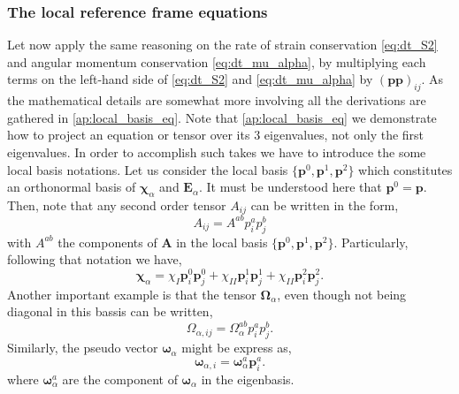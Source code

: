 \subsubsection{The local reference frame equations}

Let now apply the same reasoning on the rate of strain conservation \eqref{eq:dt_S2} and angular momentum conservation \eqref{eq:dt_mu_alpha},
by multiplying each terms on the left-hand side of \ref{eq:dt_S2} and \ref{eq:dt_mu_alpha} by $(\textbf{pp})_{ij}$. 
As the mathematical details are somewhat more involving all the derivations are gathered in \ref{ap:local_basis_eq}. 
Note that \ref{ap:local_basis_eq} we demonstrate how to project an equation or tensor over its $3$ eigenvalues, not only the first eigenvalues. 
In order to accomplish such takes we have to introduce the some local basis notations. 
Let us consider the local basis $\{\textbf{p}^0, \textbf{p}^1, \textbf{p}^2\}$ which constitutes an orthonormal basis of $\bm\chi_\alpha$ and $\textbf{E}_\alpha$. 
It must be understood here that $\textbf{p}^0 = \textbf{p}$. 
Then, note that any second order tensor $A_{ij}$ can be written in the form, 
\begin{equation*}
    A_{ij}
    = 
    A^{ab} p_i^ap_j^b
\end{equation*}
with $A^{ab}$ the components of \textbf{A} in the local basis  $\{\textbf{p}^0, \textbf{p}^1, \textbf{p}^2\}$. 
Particularly, following that notation we have,  
\begin{equation*}
    \bm\chi_\alpha
    = 
    \chi_I  \textbf{p}_i^0\textbf{p}_j^0
    + \chi_{II}  \textbf{p}_i^1\textbf{p}_j^1
    + \chi_{II}  \textbf{p}_i^2\textbf{p}_j^2. 
\end{equation*}
Another important example is that the tensor $\bm\Omega_\alpha$, even though not being diagonal in this bassis can be written, 
\begin{equation*}
    \Omega_{\alpha,ij}
    = 
    \Omega^{ab}_\alpha p_i^ap_j^b. 
\end{equation*}
Similarly, the pseudo vector $\bm\omega_\alpha$ might be express as, 
\begin{equation*}
    \bm\omega_{\alpha,i}
    = \bm\omega_\alpha^a \textbf{p}_i^a. 
\end{equation*}
where $\bm\omega_\alpha^a$ are the component of $\bm\omega_\alpha$ in the eigenbasis. 

